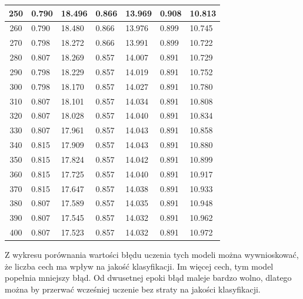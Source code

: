 \documentclass{report}
\begin{document}
\begin{minipage}{\textwidth}
\begin{longtable}{|c|l|l|l|l|l|l|}
                     250 & 0.790 & 18.496 & 0.866 & 13.969 & 0.908 & 10.813 \\ \hline
                     260 & 0.790 & 18.480 & 0.866 & 13.976 & 0.899 & 10.745 \\ \hline
                     270 & 0.798 & 18.272 & 0.866 & 13.991 & 0.899 & 10.722 \\ \hline
                     280 & 0.807 & 18.269 & 0.857 & 14.007 & 0.891 & 10.729 \\ \hline
                     290 & 0.798 & 18.229 & 0.857 & 14.019 & 0.891 & 10.752 \\ \hline
                     300 & 0.798 & 18.170 & 0.857 & 14.027 & 0.891 & 10.780 \\ \hline
                     310 & 0.807 & 18.101 & 0.857 & 14.034 & 0.891 & 10.808 \\ \hline
                     320 & 0.807 & 18.028 & 0.857 & 14.040 & 0.891 & 10.834 \\ \hline
                     330 & 0.807 & 17.961 & 0.857 & 14.043 & 0.891 & 10.858 \\ \hline
                     340 & 0.815 & 17.909 & 0.857 & 14.043 & 0.891 & 10.880 \\ \hline
                     350 & 0.815 & 17.824 & 0.857 & 14.042 & 0.891 & 10.899 \\ \hline
                     360 & 0.815 & 17.725 & 0.857 & 14.040 & 0.891 & 10.917 \\ \hline
                     370 & 0.815 & 17.647 & 0.857 & 14.038 & 0.891 & 10.933 \\ \hline
                     380 & 0.807 & 17.589 & 0.857 & 14.035 & 0.891 & 10.948 \\ \hline
                     390 & 0.807 & 17.545 & 0.857 & 14.032 & 0.891 & 10.962 \\ \hline
                     400 & 0.807 & 17.523 & 0.857 & 14.032 & 0.891 & 10.972 \\ \hline
                 \end{longtable}
    \end{minipage}

    Z wykresu porównania wartości błędu uczenia tych modeli można wywnioskować, że liczba cech ma wpływ na jakość klasyfikacji.
    Im więcej cech, tym model popełnia mniejszy błąd.
    Od dwusetnej epoki błąd maleje bardzo wolno, dlatego można by przerwać wcześniej uczenie bez straty na jakości klasyfikacji.
\end{document}
